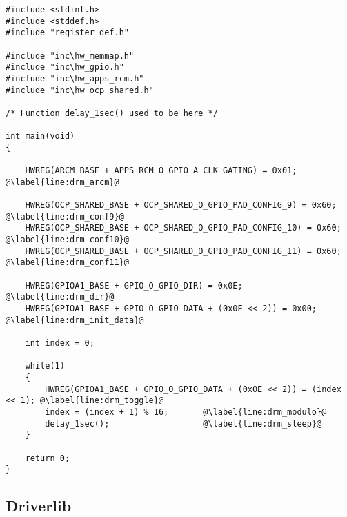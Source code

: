 \begin{lstlisting}[style=CStyle, caption={Toggling LEDs according to Table \ref{tab:led_scheme} using DRM programming technique}, captionpos=b, label={lst:led_drm}, escapechar=@]
#include <stdint.h>
#include <stddef.h>
#include "register_def.h"
 
#include "inc\hw_memmap.h"
#include "inc\hw_gpio.h"
#include "inc\hw_apps_rcm.h"
#include "inc\hw_ocp_shared.h"
 
/* Function delay_1sec() used to be here */

int main(void)
{
 
    HWREG(ARCM_BASE + APPS_RCM_O_GPIO_A_CLK_GATING) = 0x01; @\label{line:drm_arcm}@
 
    HWREG(OCP_SHARED_BASE + OCP_SHARED_O_GPIO_PAD_CONFIG_9) = 0x60; @\label{line:drm_conf9}@
    HWREG(OCP_SHARED_BASE + OCP_SHARED_O_GPIO_PAD_CONFIG_10) = 0x60; @\label{line:drm_conf10}@
    HWREG(OCP_SHARED_BASE + OCP_SHARED_O_GPIO_PAD_CONFIG_11) = 0x60; @\label{line:drm_conf11}@
 
    HWREG(GPIOA1_BASE + GPIO_O_GPIO_DIR) = 0x0E;    @\label{line:drm_dir}@
    HWREG(GPIOA1_BASE + GPIO_O_GPIO_DATA + (0x0E << 2)) = 0x00; @\label{line:drm_init_data}@
 
    int index = 0;
 
    while(1)
    {
        HWREG(GPIOA1_BASE + GPIO_O_GPIO_DATA + (0x0E << 2)) = (index << 1); @\label{line:drm_toggle}@
        index = (index + 1) % 16;       @\label{line:drm_modulo}@
        delay_1sec();                   @\label{line:drm_sleep}@
    }
 
    return 0;
}
\end{lstlisting}


\newpage
\subsection{Driverlib}

